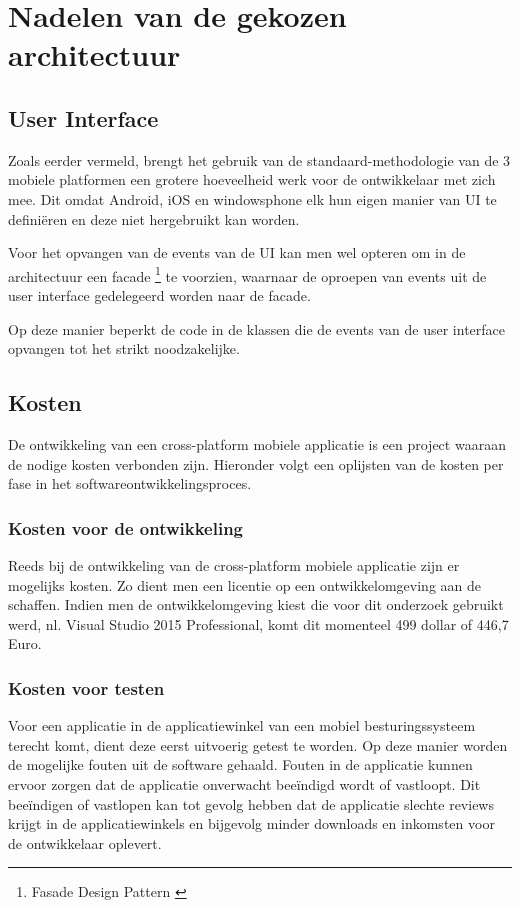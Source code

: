 \label{sec:nadelenvandegekozenapparchitectuur}
\section{Nadelen van de gekozen architectuur}
\subsection{User Interface}
Zoals eerder vermeld, brengt het gebruik van de standaard-methodologie van de 3 mobiele platformen een grotere hoeveelheid
werk voor de ontwikkelaar met zich mee. Dit omdat Android, iOS en windowsphone elk hun eigen manier van UI te definiëren en deze niet hergebruikt kan worden.

Voor het opvangen van de events van de UI kan men wel opteren om in de architectuur een facade \footnote{Fasade Design Pattern \cite{dofactorycom2017}} te voorzien, waarnaar de oproepen van events uit de user interface gedelegeerd worden naar de facade.

Op deze manier beperkt de code in de klassen die de events van de user interface opvangen tot het strikt noodzakelijke.
\label{sec:appkosten}
\subsection{Kosten}
De ontwikkeling van een cross-platform mobiele applicatie is een project waaraan de nodige kosten verbonden zijn.
Hieronder volgt een oplijsten van de kosten per fase in het softwareontwikkelingsproces.

\subsubsection{Kosten voor de ontwikkeling}
Reeds bij de ontwikkeling van de cross-platform mobiele applicatie zijn er mogelijks kosten. Zo dient men een licentie op een ontwikkelomgeving
aan de schaffen. Indien men de ontwikkelomgeving kiest die voor dit onderzoek gebruikt werd, nl. Visual Studio 2015 Professional,
komt dit momenteel 499 dollar of 446,7 Euro.

\subsubsection{Kosten voor testen}
Voor een applicatie in de applicatiewinkel van een mobiel besturingssysteem terecht komt, dient deze eerst uitvoerig getest te
worden. Op deze manier worden de mogelijke fouten uit de software gehaald. Fouten in de applicatie kunnen ervoor zorgen dat de applicatie
onverwacht beeïndigd wordt of vastloopt.
Dit beeïndigen of vastlopen kan tot gevolg hebben dat de applicatie slechte reviews krijgt in de applicatiewinkels en bijgevolg minder downloads en inkomsten voor de ontwikkelaar oplevert.

